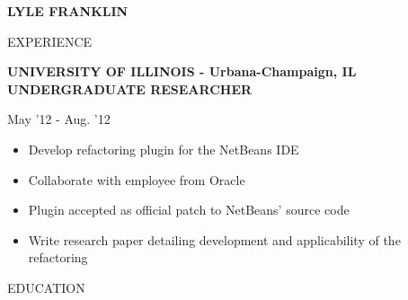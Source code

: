\documentclass[a4paper,10pt]{article}
\newcommand{\name}[1]{\textbf{\huge{#1}}}
\begin{document}
\name{LYLE FRANKLIN}

\begin{minipage}[t]{0.6\textwidth}
{\Large EXPERIENCE}

\hrulefill

\textbf{UNIVERSITY OF ILLINOIS - Urbana-Champaign, IL}
\textbf{UNDERGRADUATE RESEARCHER}

May '12 - Aug. '12

\begin{itemize}[label=,leftmargin=0.2in]
  \item Develop refactoring plugin for the NetBeans IDE
  \item Collaborate with employee from Oracle
  \item Plugin accepted as official patch to NetBeans’ source code
  \item Write research paper detailing development and applicability of the refactoring
\end{itemize}


\end{minipage}
\hspace{0.1 in}
\begin{minipage}[t]{0.3\textwidth}
EDUCATION

\hrulefill
\end{minipage}
\end{document}

